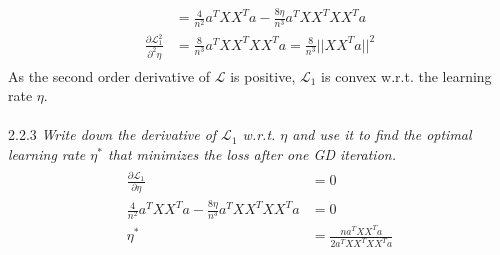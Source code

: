 \documentclass{myhw}
\begin{document}
\begin{homeworkProblem}
\begin{homeworkSection}
\begin{gather*}
\begin{aligned}
&= \frac{4}{n^2} a^T XX^T a - \frac{8\eta}{n^3} a^T XX^T XX^Ta\\
\frac{\partial \mathcal{L}_1^2}{\partial^2 \eta} &= \frac{8}{n^3} a^T XX^T XX^Ta = \frac{8}{n^3} ||XX^Ta||^2
\end{aligned}
\end{gather*}
As the second order derivative of $\mathcal{L}$ is positive, $\mathcal{L}_1$ is convex w.r.t. the learning rate $\eta$.
\\ \\
2.2.3 \emph{Write down the derivative of $\mathcal{L}_1$ w.r.t. $\eta$ and use it to find the optimal learning rate $\eta^*$ that minimizes the loss after one GD iteration.} 
\begin{gather*}
\begin{aligned}
\frac{\partial \mathcal{L}_1}{\partial \eta} &= 0 \\
\frac{4}{n^2} a^T XX^T a - \frac{8\eta}{n^3} a^T XX^T XX^Ta &= 0 \\
\eta^* &= \frac{n a^T XX^T a}{2 a^T XX^T XX^Ta}
\end{aligned}
\end{gather*}
\end{homeworkSection}
\end{homeworkProblem}
\end{document}
